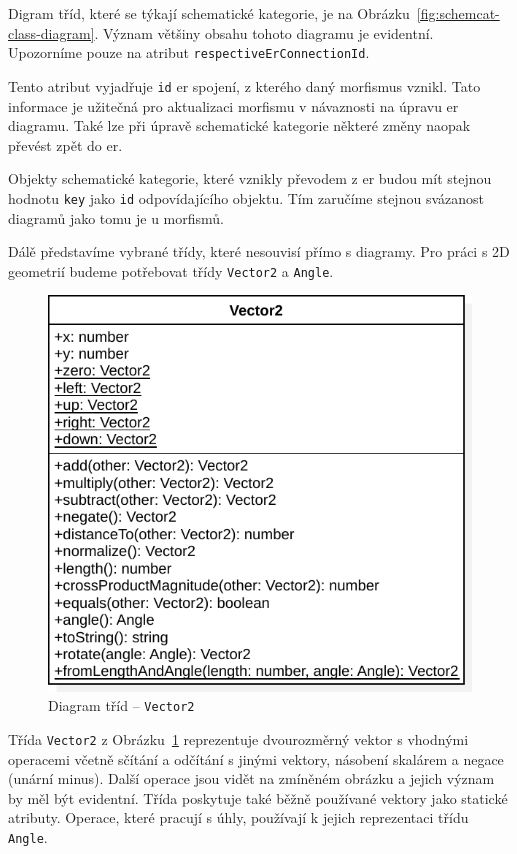 Digram tříd, které se týkají schematické kategorie, je na Obrázku~\ref{fig:schemcat-class-diagram}.
Význam většiny obsahu tohoto diagramu je evidentní.
Upozorníme pouze na atribut \texttt{respectiveErConnectionId}.

Tento atribut vyjadřuje \texttt{id} \acrshort{er} spojení, z kterého daný morfismus vznikl.
Tato informace je užitečná pro aktualizaci morfismu v návaznosti na úpravu \acrshort{er} diagramu.
Také lze při úpravě schematické kategorie některé změny naopak převést zpět do \acrshort{er}.

Objekty schematické kategorie, které vznikly převodem z \acrshort{er} budou mít stejnou hodnotu \texttt{key} jako \texttt{id} odpovídajícího objektu.
Tím zaručíme stejnou svázanost diagramů jako tomu je u morfismů.

Dálě představíme vybrané třídy, které nesouvisí přímo s diagramy.
Pro práci s 2D geometrií budeme potřebovat třídy \texttt{Vector2} a \texttt{Angle}.

\begin{figure}[!htb]
  \centering
  \includegraphics[width=\maxwidth{\textwidth}]{../img/diagrams/vector2-class-diagram.pdf}
  \caption{Diagram tříd -- \texttt{Vector2}}
  \label{fig:vector2-class-diagram}
\end{figure}

Třída \texttt{Vector2} z Obrázku~\ref{fig:vector2-class-diagram} reprezentuje dvourozměrný vektor s vhodnými operacemi včetně sčítání a odčítání s jinými vektory, násobení skalárem a negace (unární minus).
Další operace jsou vidět na zmíněném obrázku a jejich význam by měl být evidentní.
Třída poskytuje také běžně používané vektory jako statické atributy.
Operace, které pracují s úhly, používají k jejich reprezentaci třídu \texttt{Angle}.

